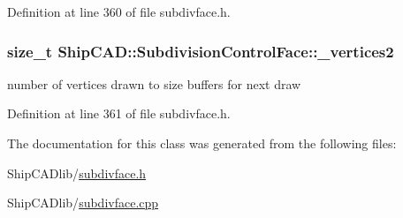 Definition at line 360 of file subdivface.\+h.

\subsubsection[{\texorpdfstring{\+\_\+vertices2}{_vertices2}}]{\setlength{\rightskip}{0pt plus 5cm}size\+\_\+t Ship\+C\+A\+D\+::\+Subdivision\+Control\+Face\+::\+\_\+vertices2\hspace{0.3cm}{\ttfamily [protected]}}\hypertarget{classShipCAD_1_1SubdivisionControlFace_a1fbe1fd20344cf8dc19bf3489f774205}{}\label{classShipCAD_1_1SubdivisionControlFace_a1fbe1fd20344cf8dc19bf3489f774205}
number of vertices drawn to size buffers for next draw 

Definition at line 361 of file subdivface.\+h.



The documentation for this class was generated from the following files\+:\begin{DoxyCompactItemize}
\item 
Ship\+C\+A\+Dlib/\hyperlink{subdivface_8h}{subdivface.\+h}\item 
Ship\+C\+A\+Dlib/\hyperlink{subdivface_8cpp}{subdivface.\+cpp}\end{DoxyCompactItemize}
